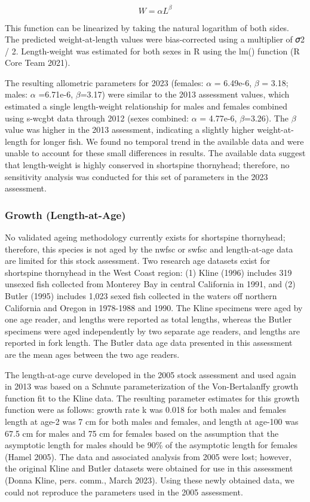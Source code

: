 \documentclass[11pt,
  english,
  letterpaper,
]{article}
\begin{document}
\begin{equation} W = \alpha L^{\beta} \end{equation}

This function can be linearized by taking the natural logarithm of both sides. The predicted weight-at-length values were bias-corrected using a multiplier of 𝜎2 / 2. Length-weight was estimated for both sexes in R using the lm() function (R Core Team 2021).

The resulting allometric parameters for 2023 (females: \(\alpha\) = 6.49e-6, \(\beta\) = 3.18; males: \(\alpha\) =6.71e-6, \(\beta\)=3.17) were similar to the 2013 assessment values, which estimated a single length-weight relationship for males and females combined using \gls{s-wcgbt} data through 2012 (sexes combined: \(\alpha\) = 4.77e-6, \(\beta\)=3.26). The \(\beta\) value was higher in the 2013 assessment, indicating a slightly higher weight-at-length for longer fish. We found no temporal trend in the available data and were unable to account for these small differences in results. The available data suggest that length-weight is highly conserved in shortspine thornyhead; therefore, no sensitivity analysis was conducted for this set of parameters in the 2023 assessment.

\hypertarget{growth-length-at-age}{%
\subsubsection{Growth (Length-at-Age)}\label{growth-length-at-age}}

No validated ageing methodology currently exists for shortspine thornyhead; therefore, this species is not aged by the \gls{nwfsc} or \gls{swfsc} and length-at-age data are limited for this stock assessment. Two research age datasets exist for shortspine thornyhead in the West Coast region: (1) Kline (1996) includes 319 unsexed fish collected from Monterey Bay in central California in 1991, and (2) Butler (1995) includes 1,023 sexed fish collected in the waters off northern California and Oregon in 1978-1988 and 1990. The Kline specimens were aged by one age reader, and lengths were reported as total lengths, whereas the Butler specimens were aged independently by two separate age readers, and lengths are reported in fork length. The Butler data age data presented in this assessment are the mean ages between the two age readers.

The length-at-age curve developed in the 2005 stock assessment and used again in 2013 was based on a Schnute parameterization of the Von-Bertalanffy growth function fit to the Kline data. The resulting parameter estimates for this growth function were as follows: growth rate k was 0.018 for both males and females length at age-2 was 7 cm for both males and females, and length at age-100 was 67.5 cm for males and 75 cm for females based on the assumption that the asymptotic length for males should be 90\% of the asymptotic length for females (Hamel 2005). The data and associated analysis from 2005 were lost; however, the original Kline and Butler datasets were obtained for use in this assessment (Donna Kline, pers. comm., March 2023). Using these newly obtained data, we could not reproduce the parameters used in the 2005 assessment.
\end{document}
